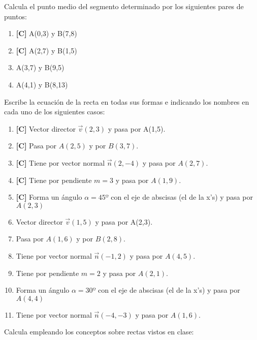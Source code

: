 \Exercicio Calcula el punto medio del segmento determinado por los siguientes pares de puntos:

\begin{enumerate}[topsep=0pt]
	\item \textbf{[C]} A(0,3) y B(7,8)
	\item \textbf{[C]} A(2,7) y B(1,5)
	
		
	\item A(3,7) y B(9,5)
	\item A(4,1) y B(8,13)
\end{enumerate}


\Exercicio Escribe la ecuación de la recta en todas sus formas e indicando los nombres en cada uno de los siguientes casos:

\begin{enumerate}[topsep=0pt]
	\item \textbf{[C]} Vector director $\overrightarrow{v}(2,3)$ y pasa por A(1,5).
	\item \textbf{[C]} Pasa por $A(2,5)$ y por $B(3,7)$.
	\item \textbf{[C]} Tiene por vector normal $\overrightarrow{n}(2,-4)$ y pasa por $A(2,7)$.
	\item \textbf{[C]} Tiene por pendiente $m=3$ y pasa por $A(1,9)$.
	\item \textbf{[C]} Forma un ángulo $\alpha=45º$ con el eje de abscisas (el de la x's) y pasa por $A(2,3)$
	
	\item Vector director $\overrightarrow{v}(1,5)$ y pasa por A(2,3).
	\item Pasa por $A(1,6)$ y por $B(2,8)$.
	\item Tiene por vector normal $\overrightarrow{n}(-1,2)$ y pasa por $A(4,5)$.
	\item Tiene por pendiente $m=2$ y pasa por $A(2,1)$.
	\item Forma un ángulo $\alpha=30º$ con el eje de abscisas (el de la x's) y pasa por $A(4,4)$
	\item Tiene por vector normal $\overrightarrow{n}(-4,-3)$ y pasa por $A(1,6)$.
\end{enumerate}


\Exercicio Calcula empleando los conceptos sobre rectas vistos en clase:

